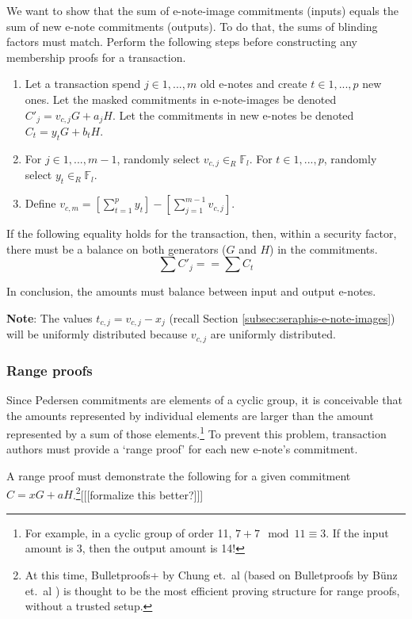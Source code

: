 We want to show that the sum of e-note-image commitments (inputs) equals the sum of new e-note commitments (outputs). To do that, the sums of blinding factors must match. Perform the following steps before constructing any membership proofs for a transaction.

\begin{enumerate}
    \item Let a transaction spend $j \in 1,...,m$ old e-notes and create $t \in 1,...,p$ new ones. Let the masked commitments in e-note-images be denoted $C'_j = v_{c,j} G + a_j H$. Let the commitments in new e-notes be denoted $C_t = y_t G + b_t H$.

    \item For $j \in 1,...,m-1$, randomly select $v_{c,j} \in_R \mathbb{F}_l$. For $t \in 1,...,p$, randomly select $y_t \in_R \mathbb{F}_l$.

    \item Define $v_{c,m} = [\sum^{p}_{t=1} y_t] - [\sum^{m-1}_{j=1} v_{c,j}]$.
\end{enumerate}

If the following equality holds for the transaction, then, within a security factor, there must be a balance on both generators ($G$ and $H$) in the commitments.\vspace{.115cm}
\[\sum C'_j == \sum C_t\]

In conclusion, the amounts must balance between input and output e-notes.

\textbf{Note}: The values $t_{c,j} = v_{c,j} - x_j$ (recall Section \ref{subsec:seraphis-e-note-images}) will be uniformly distributed because $v_{c,j}$ are uniformly distributed.

\subsubsection{Range proofs}
\label{subsubsec:confidential-transactions-range-proofs}

Since Pedersen commitments are elements of a cyclic group, it is conceivable that the amounts represented by individual elements are larger than the amount represented by a sum of those elements.\footnote{For example, in a cyclic group of order 11, $7 + 7 \mod 11 \equiv 3$. If the input amount is 3, then the output amount is 14!} To prevent this problem, transaction authors must provide a `range proof' for each new e-note's commitment.

A range proof must demonstrate the following for a given commitment $C = x G + a H$.\footnote{At this time, Bulletproofs+ by Chung et.\ al \cite{bulletproofs_plus} (based on Bulletproofs by B\"{u}nz et.\ al \cite{Bulletproofs_paper}) is thought to be the most efficient proving structure for range proofs, without a trusted setup.}[[[formalize this better?]]]

